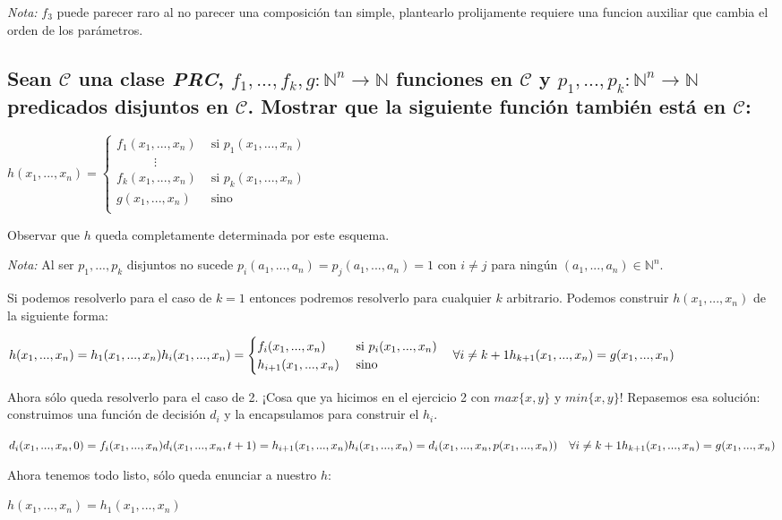 \documentclass[11pt]{article} %
\newlength{\desarrollolen}
\newcommand{\desarrollo}[2][3em]{

    \hspace{2em}
    \addtolength{\desarrollolen}{-#1}
    \begin{minipage}{\desarrollolen}
        #2
    \end{minipage}
    \addtolength{\desarrollolen}{#1}

}
\newcommand{\nat}{\mathbb{N}}
\newcommand{\Ccur}{\mathcal{C}}
\begin{document}
\emph{Nota:} $f_3$ puede parecer raro al no parecer una composición tan simple, plantearlo prolijamente requiere una funcion auxiliar que cambia el orden de los parámetros.

\subsection{Sean $\Ccur$ una clase \emph{PRC}, $f_1,...,f_k,g:\nat^n\to\nat$ funciones en $\Ccur$ y $p_1,...,p_k:\nat^n\to\nat$ predicados disjuntos en $\Ccur$. Mostrar que la siguiente función también está en $\Ccur$:}

\desarrollo{$
h(x_1,...,x_n) =
\begin{cases}
  f_1(x_1,...,x_n) & \text{ si } p_1(x_1,...,x_n) \\
  \hspace{3em}\vdots \\
  f_k(x_1,...,x_n) & \text{ si } p_k(x_1,...,x_n) \\
  g(x_1,...,x_n) & \text{ sino} \\
\end{cases}
$}

Observar que $h$ queda completamente determinada por este esquema.

\emph{Nota:} Al ser $p_1,...,p_k$ disjuntos no sucede $p_i(a_1,...,a_n) = p_j(a_1,...,a_n) = 1$ con $i \neq j$ para ningún $(a_1,...,a_n) \in \nat^n$.

Si podemos resolverlo para el caso de $k=1$ entonces podremos resolverlo para cualquier $k$ arbitrario. Podemos construir $h(x_1,...,x_n)$ de la siguiente forma:
\desarrollo{$
h(x_1,...,x_n) = h_1(x_1,...,x_n) \\
h_i(x_1,...,x_n) =
\begin{cases}
  f_i(x_1,...,x_n) & \text{ si } p_i(x_1,...,x_n) \\
  h_{i+1}(x_1,...,x_n) & \text{ sino}
\end{cases}
\hspace{1em} \forall i \neq k+1 \\
h_{k+1}(x_1,...,x_n) = g(x_1,...,x_n)
$}

Ahora sólo queda resolverlo para el caso de 2. ¡Cosa que ya hicimos en el ejercicio 2 con $max\{x,y\}$ y $min\{x,y\}$! Repasemos esa solución: construimos una función de decisión $d_i$ y la encapsulamos para construir el $h_i$.
\desarrollo{$
d_i(x_1,...,x_n,0) = f_i(x_1,...,x_n) \\
d_i(x_1,...,x_n,t+1) = h_{i+1}(x_1,...,x_n) \\ \\
h_i(x_1,...,x_n) = d_i(x_1,...,x_n,p(x_1,...,x_n)) \hspace{1em} \forall i \neq k+1 \\
h_{k+1}(x_1,...,x_n) = g(x_1,...,x_n)
$}

Ahora tenemos todo listo, sólo queda enunciar a nuestro $h$:
\desarrollo{$h(x_1,...,x_n) = h_1(x_1,...,x_n)$}
\end{document}
